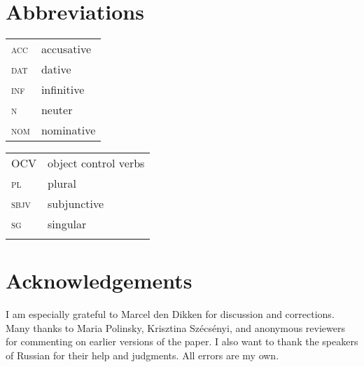 \documentclass[output=paper,colorlinks,citecolor=brown,newtxmath]{langsci/langscibook}
\begin{document}
\section*{Abbreviations}
\begin{tabularx}{.45\textwidth}{lX}
\textsc{acc}&accusative\\
\textsc{dat}&dative\\
\textsc{inf}&infinitive\\
\textsc{n}&neuter\\
\textsc{nom}&nominative\\
\end{tabularx}
\begin{tabularx}{.45\textwidth}{lX}
OCV&object control verbs\\
\textsc{pl}&plural\\
\textsc{sbjv}&subjunctive\\
\textsc{sg}&singular\\
&\\
\end{tabularx}

\section*{Acknowledgements}

I  am  especially  grateful  to  Marcel  den  Dikken  for  discussion  and corrections. Many thanks to Maria Polinsky, Krisztina Szécsényi, and anonymous reviewers for commenting on earlier versions of the paper. I  also  want  to  thank  the  speakers  of  Russian  for  their  help  and judgments. All errors are my own.

\sloppy
\printbibliography[heading=subbibliography,notkeyword=this]

\end{document}
